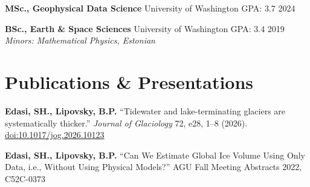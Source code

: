 \documentclass[11pt,a4paper]{article}
\begin{document}
\vspace{0.1cm}
\noindent
\textbf{MSc., Geophysical Data Science} \hfill University of Washington \hfill GPA: 3.7 \hfill 2024

\vspace{0.1cm}
\noindent
\textbf{BSc., Earth \& Space Sciences} \hfill University of Washington \hfill GPA: 3.4 \hfill 2019 \\
\textit{Minors: Mathematical Physics, Estonian}

\section*{Publications \& Presentations}

\noindent
\textbf{Edasi, SH., Lipovsky, B.P.} ``Tidewater and lake-terminating glaciers are systematically thicker.'' \textit{Journal of Glaciology} 72, e28, 1--8 (2026). \href{https://doi.org/10.1017/jog.2026.10123}{doi:10.1017/jog.2026.10123}

\noindent
\textbf{Edasi, SH., Lipovsky, B.P.} ``Can We Estimate Global Ice Volume Using Only Data, i.e., Without Using Physical Models?'' AGU Fall Meeting Abstracts 2022, C52C-0373
\end{document}
